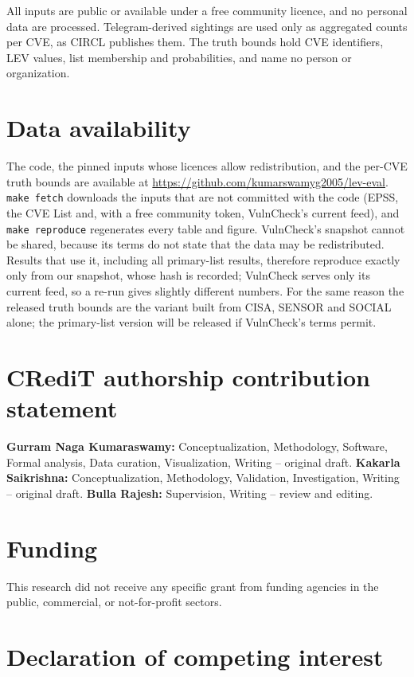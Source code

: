 All inputs are public or available under a free community licence, and no
personal data are processed. Telegram-derived sightings are used only as
aggregated counts per CVE, as CIRCL publishes them. The truth bounds hold CVE
identifiers, LEV values, list membership and probabilities, and name no person
or organization.

\section*{Data availability}\label{sec:availability}

The code, the pinned inputs whose licences allow redistribution, and the
per-CVE truth bounds are available at
\url{https://github.com/kumarswamyg2005/lev-eval}. \texttt{make fetch}
downloads the inputs that are not committed with the code (EPSS, the CVE List
and, with a free community token, VulnCheck's current feed), and \texttt{make
reproduce} regenerates every table and figure. VulnCheck's snapshot cannot be
shared, because its terms do not state that the data may be redistributed.
Results that use it, including all primary-list results, therefore reproduce
exactly only from our snapshot, whose hash is recorded; VulnCheck serves only
its current feed, so a re-run gives slightly different numbers. For the same
reason the released truth bounds are the variant built from CISA, SENSOR and
SOCIAL alone; the primary-list version will be released if VulnCheck's terms
permit.

\section*{CRediT authorship contribution statement}

\textbf{Gurram Naga Kumaraswamy:} Conceptualization, Methodology, Software,
Formal analysis, Data curation, Visualization, Writing -- original draft.
\textbf{Kakarla Saikrishna:} Conceptualization, Methodology, Validation,
Investigation, Writing -- original draft.
\textbf{Bulla Rajesh:} Supervision, Writing -- review and editing.

\section*{Funding}

This research did not receive any specific grant from funding agencies in the
public, commercial, or not-for-profit sectors.

\section*{Declaration of competing interest}


